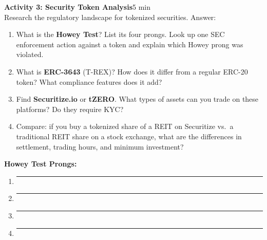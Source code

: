\documentclass[11pt,a4paper]{article}
\newcommand{\activitybox}[3]{%
  \noindent\colorbox{mllavender4}{\parbox{\dimexpr\linewidth-2\fboxsep}{%
    \textbf{\color{mlpurple}#1}\hfill\textcolor{mlgray}{\small #2}\\[2pt]#3%
  }}\par\vspace{4pt}%
}
\begin{document}
\activitybox{Activity 3: Security Token Analysis}{5 min}{%
Research the regulatory landscape for tokenized securities. Answer:
\begin{enumerate}
\item What is the \textbf{Howey Test}? List its four prongs. Look up one SEC enforcement action against a token and explain which Howey prong was violated.
\item What is \textbf{ERC-3643} (T-REX)? How does it differ from a regular ERC-20 token? What compliance features does it add?
\item Find \textbf{Securitize.io} or \textbf{tZERO}. What types of assets can you trade on these platforms? Do they require KYC?
\item Compare: if you buy a tokenized share of a REIT on Securitize vs.\ a traditional REIT share on a stock exchange, what are the differences in settlement, trading hours, and minimum investment?
\end{enumerate}
\vspace{4pt}
\noindent\textbf{Howey Test Prongs:}
\begin{enumerate}
\item \rule{9.0cm}{0.3pt}
\item \rule{9.0cm}{0.3pt}
\item \rule{9.0cm}{0.3pt}
\item \rule{9.0cm}{0.3pt}
\end{enumerate}
\vspace{2pt}
}

\vspace{2pt}
\end{document}
